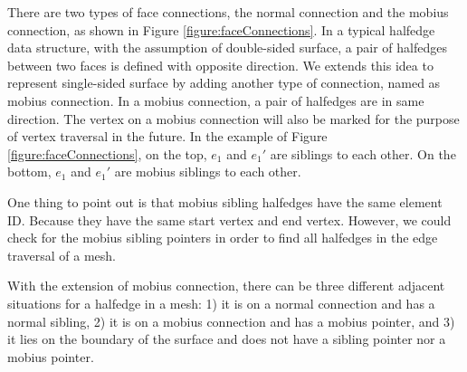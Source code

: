 \documentclass[12pt]{article}
\begin{document}
There are two types of face connections, the normal connection and the mobius connection, as shown in Figure \ref{figure:faceConnections}. In a typical halfedge data structure, with the assumption of double-sided surface, a pair of halfedges between two faces is defined with opposite direction. We extends this idea to represent single-sided surface by adding another type of connection, named as mobius connection. In a mobius connection, a pair of halfedges are in same direction. The vertex on a mobius connection will also be marked for the purpose of vertex traversal in the future. In the example of Figure \ref{figure:faceConnections}, on the top, $e_1$ and $e_1'$ are siblings to each other. On the bottom, $e_1$ and $e_1'$ are mobius siblings to each other. 

One thing to point out is that mobius sibling halfedges have the same element ID. Because they have the same start vertex and end vertex. However, we could check for the mobius sibling pointers in order to find all halfedges in the edge traversal of a mesh.

With the extension of mobius connection, there can be three different adjacent situations for a halfedge in a mesh: 1) it is on a normal connection and has a normal sibling, 2) it is on a mobius connection and has a mobius pointer, and 3) it lies on the boundary of the surface and does not have a sibling pointer nor a mobius pointer.
\end{document}
